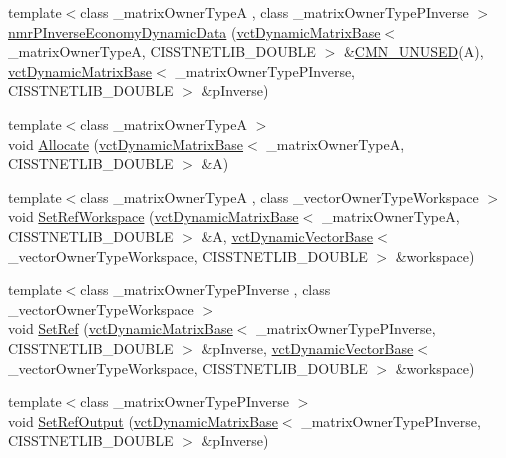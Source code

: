 \begin{DoxyCompactItemize}
{\footnotesize template$<$class \+\_\+matrix\+Owner\+Type\+A , class \+\_\+matrix\+Owner\+Type\+P\+Inverse $>$ }\\\hyperlink{classnmr_p_inverse_economy_dynamic_data_a2991bc2e206de01652bafd3c00879599}{nmr\+P\+Inverse\+Economy\+Dynamic\+Data} (\hyperlink{classvct_dynamic_matrix_base}{vct\+Dynamic\+Matrix\+Base}$<$ \+\_\+matrix\+Owner\+Type\+A, C\+I\+S\+S\+T\+N\+E\+T\+L\+I\+B\+\_\+\+D\+O\+U\+B\+L\+E $>$ \&\hyperlink{cmn_portability_8h_a021894e2626935fa2305434b1e893ff6}{C\+M\+N\+\_\+\+U\+N\+U\+S\+E\+D}(A), \hyperlink{classvct_dynamic_matrix_base}{vct\+Dynamic\+Matrix\+Base}$<$ \+\_\+matrix\+Owner\+Type\+P\+Inverse, C\+I\+S\+S\+T\+N\+E\+T\+L\+I\+B\+\_\+\+D\+O\+U\+B\+L\+E $>$ \&p\+Inverse)
\item 
{\footnotesize template$<$class \+\_\+matrix\+Owner\+Type\+A $>$ }\\void \hyperlink{classnmr_p_inverse_economy_dynamic_data_ab8170dc98fbe8c8d0035f4e08d48131e}{Allocate} (\hyperlink{classvct_dynamic_matrix_base}{vct\+Dynamic\+Matrix\+Base}$<$ \+\_\+matrix\+Owner\+Type\+A, C\+I\+S\+S\+T\+N\+E\+T\+L\+I\+B\+\_\+\+D\+O\+U\+B\+L\+E $>$ \&A)
\item 
{\footnotesize template$<$class \+\_\+matrix\+Owner\+Type\+A , class \+\_\+vector\+Owner\+Type\+Workspace $>$ }\\void \hyperlink{classnmr_p_inverse_economy_dynamic_data_a34c63c7d6807e6c8977042abb88091bb}{Set\+Ref\+Workspace} (\hyperlink{classvct_dynamic_matrix_base}{vct\+Dynamic\+Matrix\+Base}$<$ \+\_\+matrix\+Owner\+Type\+A, C\+I\+S\+S\+T\+N\+E\+T\+L\+I\+B\+\_\+\+D\+O\+U\+B\+L\+E $>$ \&A, \hyperlink{classvct_dynamic_vector_base}{vct\+Dynamic\+Vector\+Base}$<$ \+\_\+vector\+Owner\+Type\+Workspace, C\+I\+S\+S\+T\+N\+E\+T\+L\+I\+B\+\_\+\+D\+O\+U\+B\+L\+E $>$ \&workspace)
\item 
{\footnotesize template$<$class \+\_\+matrix\+Owner\+Type\+P\+Inverse , class \+\_\+vector\+Owner\+Type\+Workspace $>$ }\\void \hyperlink{classnmr_p_inverse_economy_dynamic_data_ad2c665813d6e5c8a15d8768eb05f30b9}{Set\+Ref} (\hyperlink{classvct_dynamic_matrix_base}{vct\+Dynamic\+Matrix\+Base}$<$ \+\_\+matrix\+Owner\+Type\+P\+Inverse, C\+I\+S\+S\+T\+N\+E\+T\+L\+I\+B\+\_\+\+D\+O\+U\+B\+L\+E $>$ \&p\+Inverse, \hyperlink{classvct_dynamic_vector_base}{vct\+Dynamic\+Vector\+Base}$<$ \+\_\+vector\+Owner\+Type\+Workspace, C\+I\+S\+S\+T\+N\+E\+T\+L\+I\+B\+\_\+\+D\+O\+U\+B\+L\+E $>$ \&workspace)
\item 
{\footnotesize template$<$class \+\_\+matrix\+Owner\+Type\+P\+Inverse $>$ }\\void \hyperlink{classnmr_p_inverse_economy_dynamic_data_aff2f7631c782b912f75b8d7b18cff923}{Set\+Ref\+Output} (\hyperlink{classvct_dynamic_matrix_base}{vct\+Dynamic\+Matrix\+Base}$<$ \+\_\+matrix\+Owner\+Type\+P\+Inverse, C\+I\+S\+S\+T\+N\+E\+T\+L\+I\+B\+\_\+\+D\+O\+U\+B\+L\+E $>$ \&p\+Inverse)
\end{DoxyCompactItemize}
